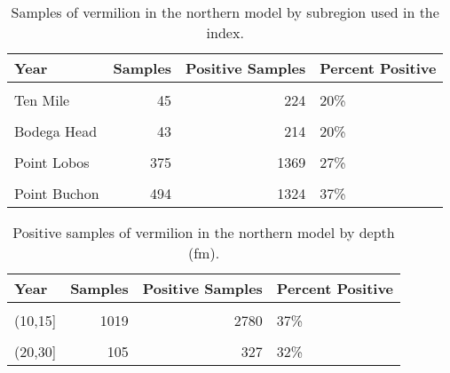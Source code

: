 \documentclass[
]{article}
\begin{document}
\begin{table}

\caption{\label{tab:tab-region-ccfrp}Samples of vermilion in the northern model by subregion used in the index.}
\centering
\begin{tabular}[t]{lrrl}
\toprule
Year & Samples & Positive Samples & Percent Positive\\
\midrule
\cellcolor{gray!6}{South Cape Mendocino} & \cellcolor{gray!6}{84} & \cellcolor{gray!6}{277} & \cellcolor{gray!6}{30\%}\\
Ten Mile & 45 & 224 & 20\%\\
\cellcolor{gray!6}{Stewarts Point} & \cellcolor{gray!6}{111} & \cellcolor{gray!6}{279} & \cellcolor{gray!6}{40\%}\\
Bodega Head & 43 & 214 & 20\%\\
\cellcolor{gray!6}{Ano Nuevo} & \cellcolor{gray!6}{484} & \cellcolor{gray!6}{1879} & \cellcolor{gray!6}{26\%}\\
\addlinespace
Point Lobos & 375 & 1369 & 27\%\\
\cellcolor{gray!6}{Piedras Blancas} & \cellcolor{gray!6}{614} & \cellcolor{gray!6}{966} & \cellcolor{gray!6}{64\%}\\
Point Buchon & 494 & 1324 & 37\%\\
\bottomrule
\end{tabular}
\end{table}

\begin{table}

\caption{\label{tab:tab-depth-ccfrp}Positive samples of vermilion in the northern model by depth (fm).}
\centering
\begin{tabular}[t]{lrrl}
\toprule
Year & Samples & Positive Samples & Percent Positive\\
\midrule
\cellcolor{gray!6}{(0,10]} & \cellcolor{gray!6}{385} & \cellcolor{gray!6}{1712} & \cellcolor{gray!6}{22\%}\\
(10,15] & 1019 & 2780 & 37\%\\
\cellcolor{gray!6}{(15,20]} & \cellcolor{gray!6}{741} & \cellcolor{gray!6}{1713} & \cellcolor{gray!6}{43\%}\\
(20,30] & 105 & 327 & 32\%\\
\bottomrule
\end{tabular}
\end{table}
\end{document}
